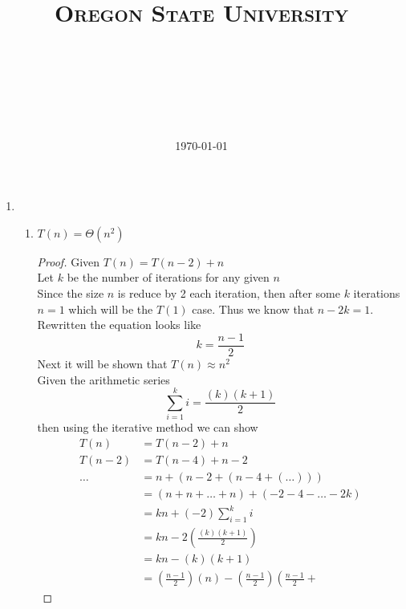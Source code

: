 \documentclass[paper=a4, fontsize=11pt]{scrartcl} %
\title{ 
    \normalfont \normalsize 
    \textsc{Oregon State University} \\ [25pt]
    \horrule{0.5pt} \\[0.4cm] %
    \huge \hwtitle \\ %
    \horrule{2pt} \\[0.5cm] %
}
\author{\name} %
\date{\normalsize\today} %
\numberwithin{equation}{section} %
\numberwithin{figure}{section} %
\numberwithin{table}{section} %
\begin{document}
\maketitle %

\begin{enumerate}

    \item \hfill \\
    \begin{enumerate}
        \item $T(n) = \Theta(n^2)$
        \begin{proof}
            Given $T(n) = T(n - 2) + n$ \\
            Let $k$ be the number of iterations for any given $n$ \\
            Since the size $n$ is reduce by 2 each iteration, then after some 
            $k$ iterations $n = 1$ which will be the $T(1)$ case. Thus we know
            that $n - 2k = 1$. Rewritten the equation looks like 
            \begin{equation}
                k = \frac{ n - 1 }{ 2 }
            \end{equation}
            Next it will be shown that $T(n) \approx n^2$ \\
            Given the arithmetic series
            \begin{equation}
                \sum\limits_{i=1}^k i = \frac{(k)(k + 1)}{2}
            \end{equation}
            then using the iterative method we can show
            \begin{align*}
                T(n) &= T(n - 2) + n \\
                T(n - 2) &= T(n - 4) + n - 2 \\
                \ldots &= n +(n - 2 +(n - 4 + (\ldots))) \\
                &= (n + n + \ldots + n) + (- 2 - 4 - \ldots - 2k) \\
                &= kn + (-2)\sum\limits_{i=1}^k i \\
                &= kn - 2\left(\frac{(k)(k + 1)}{2}\right) \tag{eq. 0.2} \\
                &= kn - (k)(k + 1) \\
                &= \left(\frac{ n - 1 }{ 2 }\right)\left(n\right) - 
                \left(\frac{ n - 1 }{ 2 }\right)\left(\frac{ n - 1 }{ 2 } + 

\end{align*}
\end{proof}
\end{enumerate}
\end{enumerate}
\end{document}

